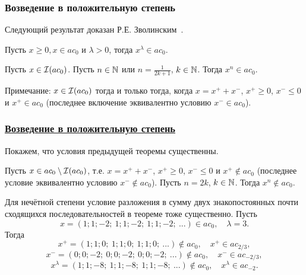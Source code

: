 \begin{frame}\frametitle{Возведение в положительную степень}
	Следующий результат доказан Р.Е. Зволинским~\cite{zvol2022ac}.

	\begin{ttheorem}
		\label{thm:Zvol_pow_pos}
		Пусть $x \geqslant 0, x \in a c_0$ и $\lambda>0$, тогда $x^\lambda \in a c_0$.
	\end{ttheorem}

	\begin{ttheorem}
		\label{thm:Zvol_pow_composed}
		Пусть $x\in \mathcal{I}(ac_0)$.
		Пусть $n\in\mathbb{N}$ или $n = \frac1{2k+1}$, $k\in\mathbb{N}$.
		Тогда $x^n \in ac_0$.
	\end{ttheorem}

	Примечание: $x\in \mathcal{I}(ac_0)$ тогда и только тогда, когда $x = x^+ +x^-$, $x^+\geq 0$, $x^- \leq 0$ и $x^+ \in ac_0$
	(последнее включение эквивалентно условию $x^- \in ac_0$).

\end{frame}



\begin{frame}\frametitle{\underline{Возведение в положительную степень}}
	Покажем, что условия предыдущей теоремы существенны.

	\begin{llemma}
		\label{thm:ac0_pow_even}
		Пусть $x\in ac_0 \setminus \mathcal{I}(ac_0)$, т.е. $x = x^+ +x^-$, $x^+\geq 0$, $x^- \leq 0$ и $x^+ \notin ac_0$
		(последнее условие эквивалентно условию $x^- \notin ac_0$).
		Пусть $n = 2k$, $k\in\mathbb{N}$.
		Тогда $x^n \notin ac_0$.
	\end{llemma}





	\begin{eexample}
		Для нечётной степени условие разложения в сумму двух знакопостоянных
		почти сходящихся последовательностей в теореме тоже существенно.
		Пусть
		\begin{equation}
			x = (1;1;-2;\ 1;1;-2;\ 1;1;-2;\ ...) \in ac_0
			,
			\quad
			\lambda = 3
			.
		\end{equation}
		Тогда
		\begin{equation}
			x^+ = (1;1;0;\ 1;1;0;\ 1;1;0;\ ...) \notin ac_0, \quad x^+ \in ac_{2/3}
			,
		\end{equation}
		\begin{equation}
			x^- = (0;0;-2;\ 0;0;-2;\ 0;0;-2;\ ...) \notin ac_0, \quad x^- \in ac_{-2/3}
			,
		\end{equation}
		\begin{equation}
			x^\lambda = (1;1;-8;\ 1;1;-8;\ 1;1;-8;\ ...) \notin ac_0, \quad x^\lambda \in ac_{-2}
			.
		\end{equation}
	\end{eexample}



\end{frame}




